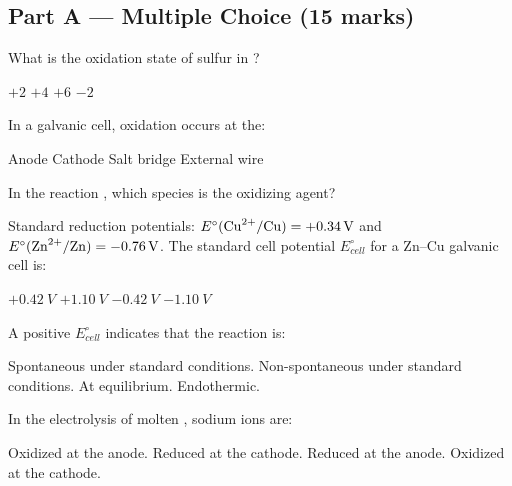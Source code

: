 \documentclass[addpoints]{exam}
\begin{document}
\newpage
\begin{questions}

\section*{Part A --- Multiple Choice (15 marks)}
\vspace{5mm}

\question[1] What is the oxidation state of sulfur in ?
\begin{choices}
    \choice $+2$
    \choice $+4$
    \correctchoice $+6$
    \choice $-2$
\end{choices}

\question[1] In a galvanic cell, oxidation occurs at the:
\begin{choices}
    \correctchoice Anode
    \choice Cathode
    \choice Salt bridge
    \choice External wire
\end{choices}

\question[1] In the reaction , which species is
the oxidizing agent?
\begin{choices}
    \choice {}
    \choice {}
    \correctchoice {}
    \choice {}
\end{choices}

\question[1] Standard reduction potentials: $E^\circ(\ce{Cu^{2+}/Cu}) = +\SI{0.34}{V}$ and
$E^\circ(\ce{Zn^{2+}/Zn}) = -\SI{0.76}{V}$. The standard cell potential $E^\circ_{cell}$ for
a Zn--Cu galvanic cell is:
\begin{choices}
    \choice $+\SI{0.42}{V}$
    \correctchoice $+\SI{1.10}{V}$
    \choice $-\SI{0.42}{V}$
    \choice $-\SI{1.10}{V}$
\end{choices}

\question[1] A positive $E^\circ_{cell}$ indicates that the reaction is:
\begin{choices}
    \correctchoice Spontaneous under standard conditions.
    \choice Non-spontaneous under standard conditions.
    \choice At equilibrium.
    \choice Endothermic.
\end{choices}

\question[1] In the electrolysis of molten , sodium ions are:
\begin{choices}
    \choice Oxidized at the anode.
    \correctchoice Reduced at the cathode.
    \choice Reduced at the anode.
    \choice Oxidized at the cathode.
\end{choices}


\end{questions}
\end{document}
